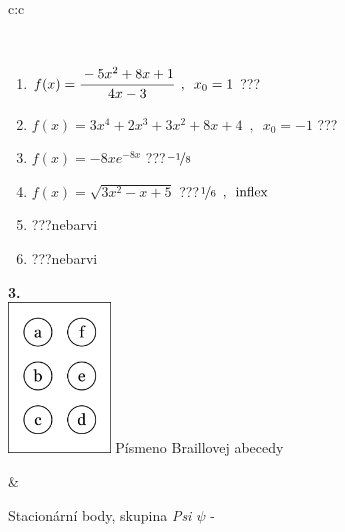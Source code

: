 \documentclass[10pt]{report}
\begin{document}
\begin{tabular}{c:c}
\begin{minipage}[c][104.5mm][t]{0.5\linewidth}
\begin{center}
\begin{minipage}{0.95\linewidth}
\begin{center}
\end{center}
\end{minipage}
\\[1mm]
\begin{minipage}{0.79\linewidth}
\begin{center}
\begin{varwidth}{\linewidth}
\begin{enumerate}
\normalsize
\item $f(x)=\cfrac{-5x^2+8x+1}{4x-3}\enspace , \enspace x_0=1$\quad \dotfill\; ???\;\dotfill \quad {}
\item $f(x)=3x^4+2x^3+3x^2+8x+4\enspace , \enspace x_0=-1$\quad \dotfill\; ???\;\dotfill \quad {}
\item $f(x)=-8xe^{-8x}$\quad \dotfill\; ???\;\dotfill \quad $\nicefrac{-1}{8}$
\item $f(x)=\sqrt{3x^2-x+5}$\quad \dotfill\; ???\;\dotfill \quad $\nicefrac{1}{6}\enspace , \enspace\mathrm{inflex}$
\item \quad \dotfill\; ???\;\dotfill \quad nebarvi
\item \quad \dotfill\; ???\;\dotfill \quad nebarvi
\end{enumerate}
\end{varwidth}
\end{center}
\end{minipage}
\begin{minipage}{0.20\linewidth}
\begin{center}
{\Huge\bfseries 3.} \\[2mm]
\includegraphics[height=40mm]{../images/braille.png}
{\small Písmeno Braillovej abecedy}
\end{center}
\end{minipage}
\end{center}
\end{minipage}
&
\begin{minipage}[c][104.5mm][t]{0.5\linewidth}
\begin{center}
\vspace{7mm}
{\huge Stacionární body, skupina \textit{Psi $\psi$} -}\\[5mm]

\end{center}
\end{minipage}
\end{tabular}
\end{document}
